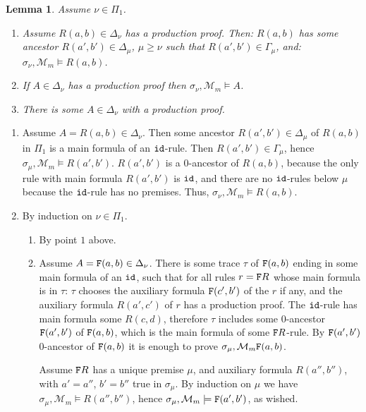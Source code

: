 \documentclass[a4paper,12pt]{article}
\newtheorem{lemma}[theorem]{Lemma}
\newenvironment{proof}[1][Proof]{\begin{trivlist}
\item[\hskip \labelsep {\bfseries #1}]}{\end{trivlist}}
\newcommand{\setM}              { {\mathcal M} }
\newcommand{\Forward}         { {\tt F} }
\newcommand{\id}              { {\tt id} }
\begin{document}
\begin{lemma}
\label{lemma-production}
Assume $\nu \in \Pi_1$.
\begin{enumerate}
\item
Assume $R(a,b) \in \Delta_\nu$ has a production proof. Then: $R(a,b)$ has some ancestor $R(a',b') \in \Delta_\mu$, $\mu \ge \nu$ such that $R(a',b') \in \Gamma_\mu$, and: $\sigma_\nu, \setM_m \models R(a,b)$.
\item
If $A \in \Delta_\nu$ has a production proof then $\sigma_\nu, \setM_m \models A$. 
\item
There is some $A \in \Delta_\nu$ with a production proof.
\end{enumerate}
\end{lemma}

\begin{proof}
\begin{enumerate}
\item
Assume $A = R(a,b) \in \Delta_\nu$. Then some ancestor $R(a',b') \in \Delta_\mu$ of $R(a,b)$ in $\Pi_1$ is a main formula of an $\id$-rule. Then $R(a',b') \in \Gamma_\mu$, hence $\sigma_\mu, \setM_m \models R(a',b')$.  $R(a',b')$ is a $0$-ancestor of $R(a,b)$, because the only rule with main formula $R(a',b')$ is $\id$, and there are no $\id$-rules below $\mu$ because the $\id$-rule has no premises. Thus, $\sigma_\nu, \setM_m \models R(a,b)$.

\item
By induction on $\nu \in \Pi_1$. 

\begin{enumerate}
\item
By point $1$ above.
\item
Assume $A = \Forward(a,b) \in \Delta_\nu$. There is some trace $\tau$  of $\Forward(a,b)$ ending in some main formula of an $\id$, such that for all rules $r = \Forward R$ whose main formula is in $\tau$: $\tau$ chooses the auxiliary formula $\Forward(c',b')$ of the $r$ if any, and the auxiliary formula $R(a',c')$ of $r$ has a production proof. The $\id$-rule has main formula some $R(c,d)$, therefore $\tau$ includes some $0$-ancestor $\Forward(a',b')$ of  $\Forward(a,b)$, which is the main formula of some $\Forward R$-rule. By $\Forward(a',b')$ $0$-ancestor  of  $\Forward(a,b)$ it is enough to prove $\sigma_\mu, \setM_m \Forward(a,b)$. 

Assume $\Forward R$ has a unique premise $\mu$, and auxiliary formula $R(a'',b'')$, with $a'=a''$, $b'=b''$ true in $\sigma_\mu$. By induction on $\mu$ we have $\sigma_\mu, \setM_m \models R(a'',b'')$, hence $\sigma_\mu, \setM_m \models \Forward(a',b')$, as wished. 


\end{enumerate}
\end{enumerate}
\end{proof}
\end{document}
